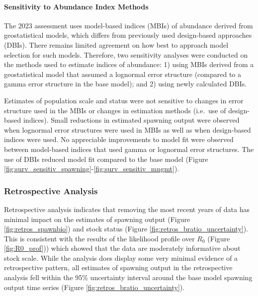 \documentclass[11pt,
  letterpaper,
]{article}
\begin{document}
\hypertarget{sensitivity-to-abundance-index-methods}{%
\paragraph{Sensitivity to Abundance Index Methods}\label{sensitivity-to-abundance-index-methods}}

The 2023 assessment uses model-based indices (MBIs) of abundance derived from geostatistical models, which differs from previously used design-based approaches (DBIs). There remains limited agreement on how best to approach model selection for such models. Therefore, two sensitivity analyses were conducted on the methods used to estimate indices of abundance: 1) using MBIs derived from a geostatistical model that assumed a lognormal error structure (compared to a gamma error structure in the base model); and 2) using newly calculated DBIs.

Estimates of population scale and status were not sensitive to changes in error structure used in the MBIs or changes in estimation methods (i.e.~use of design-based indices). Small reductions in estimated spawning output were observed when lognormal error structures were used in MBIs as well as when design-based indices were used. No appreciable improvements to model fit were observed between model-based indices that used gamma or lognormal error structures. The use of DBIs reduced model fit compared to the base model (Figure \ref{fig:surv_sensitiv_spawning}-\ref{fig:surv_sensitiv_mngmt}).

\hypertarget{retrospective-analysis}{%
\subsubsection{Retrospective Analysis}\label{retrospective-analysis}}

Retrospective analysis indicates that removing the most recent years of data has minimal impact on the estimates of spawning output (Figure \ref{fig:retros_spawnbio}) and stock status (Figure \ref{fig:retros_bratio_uncertainty}). This is consistent with the results of the likelihood profile over \(R_0\) (Figure \ref{fig:R0_prof})) which showed that the data are moderately informative about stock scale. While the analysis does display some very minimal evidence of a retrospective pattern, all estimates of spawning output in the retrospective analysis fell within the 95\% uncertainty interval around the base model spawning output time series (Figure \ref{fig:retros_bratio_uncertainty}).
\end{document}
